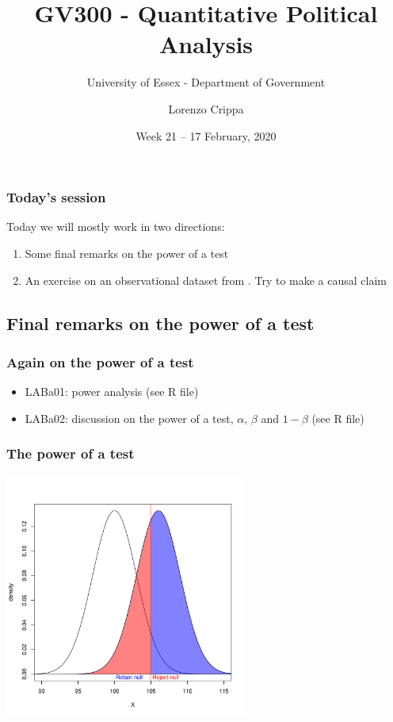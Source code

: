 \documentclass[xcolor=table,dvipsnames]{beamer}
\title{GV300 - Quantitative Political Analysis}
\subtitle{University of Essex - Department of Government}
\date{Week 21 -- 17 February, 2020}				%
\author{Lorenzo Crippa}
\begin{document}
\begin{frame}[plain]
\begin{center}
\titlepage
\end{center}
\end{frame}

\begin{frame}
\frametitle{Today's session}
Today we will mostly work in two directions: \pause
\begin{enumerate}
\item Some final remarks on the power of a test \pause
\item An exercise on an observational dataset from \cite{card1993}. Try to make a causal claim
\end{enumerate}
\end{frame}

\begin{frame}
\section{Final remarks on the power of a test}
\end{frame}

\begin{frame}
\frametitle{Again on the power of a test}
\begin{itemize}
\item LABa01: power analysis (see R file)
\item LABa02: discussion on the power of a test, $\alpha$, $\beta$ and $1-\beta$ (see R file)
\end{itemize}
\end{frame}

\begin{frame}
\frametitle{The power of a test}
\begin{center}
\includegraphics[width = 80mm]{pictures/week_21_power.pdf}
\end{center}
\end{frame}
\end{document}
